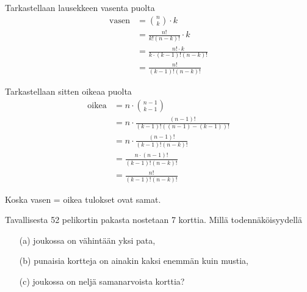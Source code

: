 \documentclass[12pt,a4paper]{article}
\begin{document}
\begin{kohta}
Tarkastellaan lausekkeen vasenta puolta
\begin{align*}
\text{vasen} &= \binom{n}{k} \cdot k \\
&= \frac{n!}{k!(n-k)!} \cdot k \\
&= \frac{n! \cdot k}{k \cdot (k-1)!(n-k)!} \\
&= \frac{n!}{(k-1)!(n-k)!}
\end{align*}

Tarkastellaan sitten oikeaa puolta
\begin{align*}
\text{oikea} &= n \cdot \binom{n-1}{k-1} \\
&= n \cdot \frac{(n-1)!}{(k-1)!((n-1)-(k-1))!} \\
&= n \cdot \frac{(n-1)!}{(k-1)!(n-k)!} \\
&= \frac{n \cdot (n-1)!}{(k-1)!(n-k)!} \\
&= \frac{n!}{(k-1)!(n-k)!}
\end{align*}

Koska vasen = oikea tulokset ovat samat.
\end{kohta}









\newpage
{}

Tavallisesta 52 pelikortin pakasta nostetaan 7 korttia. Millä todennäköisyydellä
\begin{enumerate}
\item[(a)] joukossa on vähintään yksi pata,
\item[(b)] punaisia kortteja on ainakin kaksi enemmän kuin mustia,
\item[(c)] joukossa on neljä samanarvoista korttia?
\end{enumerate}
\end{document}
